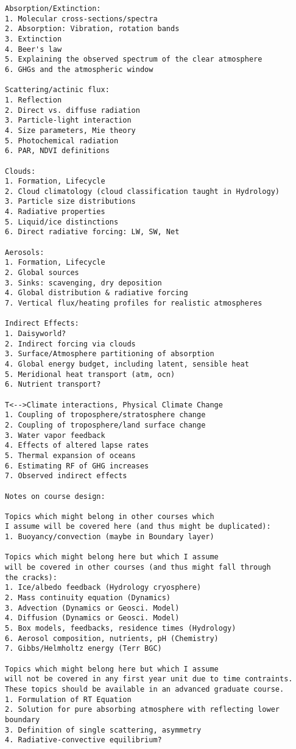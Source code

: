 \documentclass[12pt,twoside]{article}
\begin{document}
\begin{verbatim}
Absorption/Extinction:
1. Molecular cross-sections/spectra
2. Absorption: Vibration, rotation bands
3. Extinction
4. Beer's law
5. Explaining the observed spectrum of the clear atmosphere
6. GHGs and the atmospheric window

Scattering/actinic flux:
1. Reflection
2. Direct vs. diffuse radiation
3. Particle-light interaction
4. Size parameters, Mie theory
5. Photochemical radiation
6. PAR, NDVI definitions

Clouds:
1. Formation, Lifecycle
2. Cloud climatology (cloud classification taught in Hydrology)
3. Particle size distributions
4. Radiative properties
5. Liquid/ice distinctions
6. Direct radiative forcing: LW, SW, Net

Aerosols:
1. Formation, Lifecycle
2. Global sources
3. Sinks: scavenging, dry deposition
4. Global distribution & radiative forcing
7. Vertical flux/heating profiles for realistic atmospheres

Indirect Effects:
1. Daisyworld?
2. Indirect forcing via clouds
3. Surface/Atmosphere partitioning of absorption
4. Global energy budget, including latent, sensible heat
5. Meridional heat transport (atm, ocn)
6. Nutrient transport?

T<-->Climate interactions, Physical Climate Change
1. Coupling of troposphere/stratosphere change
2. Coupling of troposphere/land surface change
3. Water vapor feedback
4. Effects of altered lapse rates
5. Thermal expansion of oceans
6. Estimating RF of GHG increases
7. Observed indirect effects

Notes on course design:

Topics which might belong in other courses which
I assume will be covered here (and thus might be duplicated):
1. Buoyancy/convection (maybe in Boundary layer)

Topics which might belong here but which I assume
will be covered in other courses (and thus might fall through 
the cracks):
1. Ice/albedo feedback (Hydrology cryosphere)
2. Mass continuity equation (Dynamics)
3. Advection (Dynamics or Geosci. Model)
4. Diffusion (Dynamics or Geosci. Model)
5. Box models, feedbacks, residence times (Hydrology)
6. Aerosol composition, nutrients, pH (Chemistry)
7. Gibbs/Helmholtz energy (Terr BGC)

Topics which might belong here but which I assume
will not be covered in any first year unit due to time contraints.
These topics should be available in an advanced graduate course.
1. Formulation of RT Equation
2. Solution for pure absorbing atmosphere with reflecting lower boundary
3. Definition of single scattering, asymmetry
4. Radiative-convective equilibrium?
\end{verbatim}
\clearpage
\end{document}
